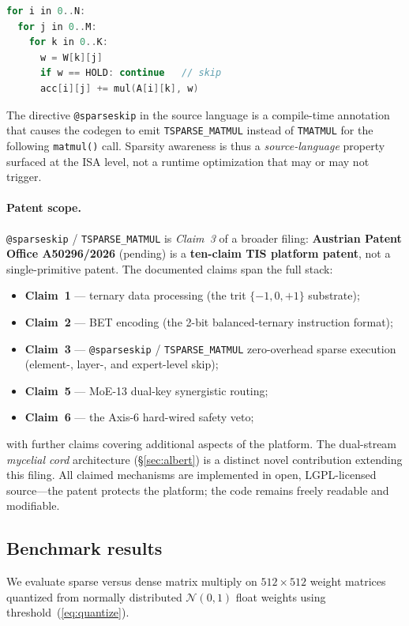 \documentclass[11pt,a4paper]{article}
\begin{document}
\begin{lstlisting}[language=C, caption={TSPARSE\_MATMUL pseudocode}]
for i in 0..N:
  for j in 0..M:
    for k in 0..K:
      w = W[k][j]
      if w == HOLD: continue   // skip
      acc[i][j] += mul(A[i][k], w)
\end{lstlisting}

The directive \texttt{@sparseskip} in the source language is a compile-time
annotation that causes the codegen to emit \texttt{TSPARSE\_MATMUL} instead of
\texttt{TMATMUL} for the following \texttt{matmul()} call. Sparsity awareness
is thus a \emph{source-language} property surfaced at the ISA level, not a
runtime optimization that may or may not trigger.

\paragraph{Patent scope.} \texttt{@sparseskip} / \texttt{TSPARSE\_MATMUL} is
\emph{Claim~3} of a broader filing: \textbf{Austrian Patent Office A50296/2026}
(pending) is a \textbf{ten-claim TIS platform patent}, not a single-primitive patent.
The documented claims span the full stack:
\begin{itemize}
  \item \textbf{Claim~1} --- ternary data processing (the trit $\{-1,0,+1\}$ substrate);
  \item \textbf{Claim~2} --- BET encoding (the 2-bit balanced-ternary instruction format);
  \item \textbf{Claim~3} --- \texttt{@sparseskip} / \texttt{TSPARSE\_MATMUL} zero-overhead
        sparse execution (element-, layer-, and expert-level skip);
  \item \textbf{Claim~5} --- MoE-13 dual-key synergistic routing;
  \item \textbf{Claim~6} --- the Axis-6 hard-wired safety veto;
\end{itemize}
with further claims covering additional aspects of the platform. The dual-stream
\emph{mycelial cord} architecture (\S\ref{sec:albert}) is a distinct novel contribution
extending this filing. All claimed mechanisms are implemented in open, LGPL-licensed
source---the patent protects the platform; the code remains freely readable and modifiable.

\subsection{Benchmark results}

We evaluate sparse versus dense matrix multiply on $512 \times 512$ weight
matrices quantized from normally distributed $\mathcal{N}(0,1)$ float weights
using threshold~(\ref{eq:quantize}).
\end{document}
